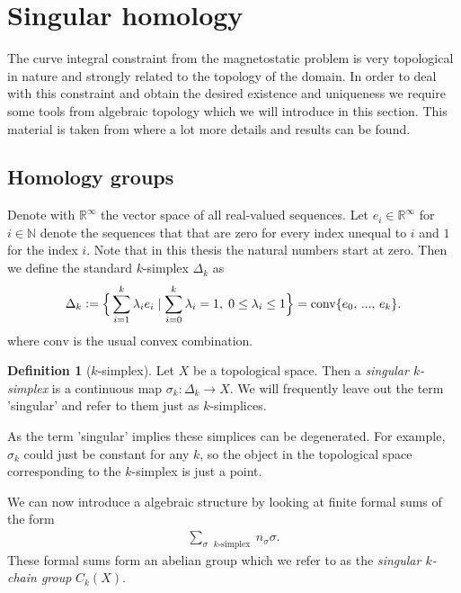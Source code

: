\documentclass[12pt,a4paper]{article}
\numberwithin{equation}{subsection}
\numberwithin{lemma}{subsection}
\theoremstyle{definition}
\newtheorem{definition}[lemma]{Definition}
\newcommand{\naturalnum}{\mathbb{N}}
\newcommand{\real}{\mathbb{R}}
\begin{document}
\section{Singular homology}\label{sec:singular_homology}

The curve integral constraint from the magnetostatic problem is very topological %
in nature and strongly related to the topology of the domain. 
In order to deal with this constraint and obtain the desired existence and
uniqueness we require some tools from algebraic topology which we will introduce 
in this section. 
This material is taken from
\cite{topology_and_geometry} where a lot more details and results can be found.

\subsection{Homology groups}

Denote with $\real^\infty$ the vector space of all real-valued sequences. Let 
$e_i \in \real^\infty$ for $i \in \naturalnum$ denote the sequences that 
that are zero for every index 
unequal to $i$ and $1$ for the index $i$. Note that in this thesis 
the natural numbers start at zero. Then we define the standard $k$-simplex 
$\Delta_k$ as
\begin{align*}
    \Delta_k \vcentcolon= \Big\{ \sum\limits_{i=1}^k  \lambda_i e_i \mid 
    \sum\limits_{i=0}^k \lambda_i = 1 , \; 0\leq \lambda_i \leq 1\Big\}
    = \text{conv} \{e_0,\,...,\, e_k\}.
\end{align*}
where $\text{conv}$ is the usual convex combination. 

\begin{definition}[$k$-simplex]
Let $X$ be a topological space. Then a \textit{singular $k$-simplex} is a continuous 
map $\sigma_k: \Delta_k \rightarrow X$. We will frequently leave out the term 'singular'
and refer to them just as $k$-simplices.
\end{definition}

As the term 'singular' implies these simplices can be degenerated. For example, $\sigma_k$ could 
just be constant for any $k$, so the object in the topological space corresponding to the 
$k$-simplex is just a point.

We can now introduce a algebraic structure by looking at finite formal sums of the form 
\begin{align*}
    \sum_{\text{$\sigma$ $k$-simplex }} n_\sigma \sigma.
\end{align*}
These formal sums form an abelian group which we refer to as the 
\textit{singular $k$-chain group} $C_k(X)$. 
\end{document}
